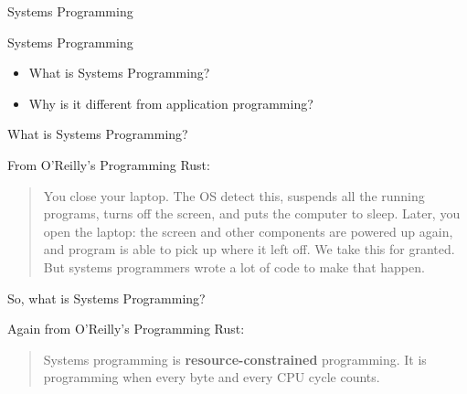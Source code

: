 \begin{section}{Systems Programming}

  \begin{frame}{Systems Programming}
    \begin{itemize}
    \item What is Systems Programming?
    \item Why is it different from application programming?
    \end{itemize}
  \end{frame}

  \begin{frame}{What is Systems Programming?}
    \begin{block}{From O'Reilly's Programming Rust\cite{ProgrammingRust}:}
      \begin{quotation}
        You close your laptop. The OS detect this, suspends all the
        running programs, turns off the screen, and puts the computer to
        sleep. Later, you open the laptop: the screen and other components are
        powered up again, and program is able to pick up where it left
        off. We take this for granted. But systems programmers wrote a lot of
        code to make that happen.
      \end{quotation}
    \end{block}
  \end{frame}

  \begin{frame}{So, what is Systems Programming?}
    \begin{block}{Again from O'Reilly's Programming Rust\cite{ProgrammingRust}:}
      \begin{quotation}
        Systems programming is \textbf{resource-constrained}
        programming. It is programming when every byte and every CPU cycle
        counts.
      \end{quotation}
    \end{block}
  \end{frame}

\end{section}
